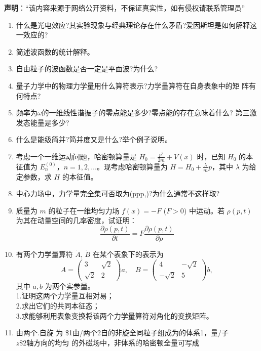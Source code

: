 
\textbf{声明}：“该内容来源于网络公开资料，不保证真实性，如有侵权请联系管理员”


\begin{enumerate}
\item 什么是光电效应?其实验现象与经典理论存在什么矛盾?爱因斯坦是如何解释这一效应的?
\item 简述波函数的统计解释。
\item 自由粒子的波函数是否一定是平面波?为什么?
\item 量子力学中的物理力学量用什么算符表示?力学量算符在自身表象中的矩
阵有何特点?
\item 频率为$\omega$的一维线性谐振子的零点能是多少?零点能的存在意味着什么?
第三激发态能量是多少?
\item 什么是能级简并?简并度又是什么?举个例子说明。
\item 考虑一个一维运动问题，哈密顿算量是 $H_0 = \frac{p^2}{2m} + V(x)$ 时，已知 $H_0$ 的本征值为 $E_n^{(0)}$，$n = 1, 2, \dots$。现考虑哈密顿算量为 $H = H_0 + \frac{\lambda}{m} p$，其中 $\lambda$ 为给定参数，求 $H$ 的本征值。
\item 中心力场中，力学量完全集可否取为(ppp,)?为什么通常不这样取?
\item 质量为 $m$ 的粒子在一维均匀力场 $f(x) = -F$ ($F > 0$) 中运动。若 $\rho(p, t)$ 为其在动量空间的几率密度，试证明：
$$\frac{\partial \rho(p, t)}{\partial t} = F \frac{\partial \rho(p, t)}{\partial p}~$$
\item 有两个力学量算符 $\dot A$, $\dot B$ 在某个表象下的表示为
$$A = \begin{pmatrix}3 & \sqrt{2} \\\sqrt{2} & 2\end{pmatrix} a, \quad B = \begin{pmatrix}4 & -\sqrt{2} \\-\sqrt{2} & 5\end{pmatrix} b,~$$
其中 $a, b$ 为两个实参量。\\
1.证明这两个力学量互相对易；\\
2.求出它们的共同本征态；\\
3.求能够利用表象变换将该两个力学量算符对角化的变换矩阵。\\
\item 由两个.自旋 为 \$1由/两个2自$ 的非旋全同粒子组成为的 $体系1，量/子 $z\$2 轴方向的$均匀 的外磁场中，非体系的哈密顿全量可写成

\end{enumerate}
